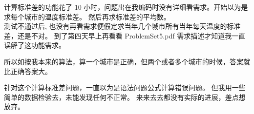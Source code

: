 计算标准差的功能花了 10
小时，问题出在我编码时没有详细看需求。开始以为是求每个城市的温度标准差。
然后再求标准差的平均数。\\
测试不通过后,
也没有再看需求便假定求当年几个城市所有当年每天温度的标准差，还是不对。
到了第四天早上再看看 ProblemSet5.pdf
需求描述才知道我一直误解了这功能需求。



所以如按我本来的算法，算一个城市是正确，但两个或者多个城市的时候，答案就比正确答案大。

针对这个计算标准差问题，一直以为是语法问题公式计算错误问题。
但我用一些简单的数据检验去，未能发现任何不正常。
来来去去都没有实际的进展，差点想放弃。

